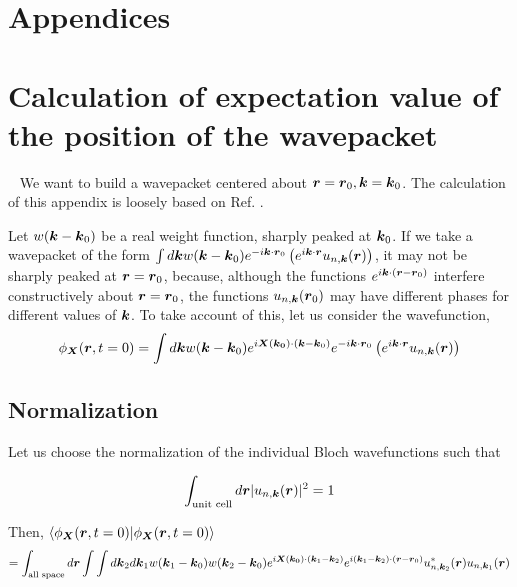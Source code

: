 \documentclass{report}
\renewcommand\vec[1]{\ensuremath\boldsymbol{#1}} %
\begin{document}
\chapter*{\center Appendices}%
\appendix

\chapter{Calculation of expectation value of the position of the wavepacket}~\label{app:center-at-zero-time}
We want to build a wavepacket centered about $\vec{r}= \vec{r}_0, \vec{k}= \vec{k}_0$. The calculation of this appendix is loosely based on Ref. \cite{ralph2020berry}.


Let  $w(\vec{k} - \vec{k}_0)$ be a real weight function, sharply peaked at $\vec{k}_0$. If we take a wavepacket of the form $\int d\vec{k} w(\vec{k} - \vec{k}_0) e^{-i \vec{k} \cdot \vec{r}_0 } \left(e^{i \vec{k} \cdot\vec{r}} u_{n,\vec{k}}(\vec{r})\right)$, it may not be sharply peaked at $\vec{r} = \vec{r}_0$, because, although the functions $e^{i \vec{k} \cdot(\vec{r} - \vec{r}_0)}$ interfere constructively about $\vec{r} = \vec{r}_0$, the functions $u_{n,\vec{k}}(\vec{r}_0)$ may have different phases for different values of $\vec{k}$. To take account of this, let us consider the wavefunction, 
\begin{equation}\label{Eq:wavefunction-X}
	\phi_{\vec{X}}(\vec{r}, t=0) = \int d\vec{k} w(\vec{k} - \vec{k}_0) e^{i \vec{X}(\vec{k_0})\cdot (\vec{k} - \vec{k}_0)} e^{-i \vec{k} \cdot \vec{r}_0 } \left(e^{i \vec{k} \cdot\vec{r}} u_{n,\vec{k}}(\vec{r})\right)
\end{equation}

\section{Normalization}\label{app:sec:Bloch-normalization}
 Let us choose the normalization of the individual Bloch wavefunctions such that

\begin{equation}\label{Eq:BlochNormalization}
	\int_{\text{unit cell}} d\vec{r} |u_{n,\vec{k}}(\vec{r})|^2 = 1
\end{equation}

Then, $\bra{\phi_{\vec{X}}(\vec{r}, t=0)}\ket{\phi_{\vec{X}}(\vec{r}, t=0)}$
$$ = \int_{\text{all space}} d\vec{r} \int \int d\vec{k}_2 d\vec{k}_1  w(\vec{k}_1 - \vec{k}_0) w(\vec{k}_2 - \vec{k}_0) e^{i \vec{X}(\vec{k_0})\cdot (\vec{k}_1 - \vec{k}_2)} e^{i (\vec{k}_1 - \vec{k}_2) \cdot (\vec{r} - \vec{r}_0) }  u^*_{n,\vec{k}_2}(\vec{r}) u_{n,\vec{k}_1}(\vec{r})$$
\end{document}
